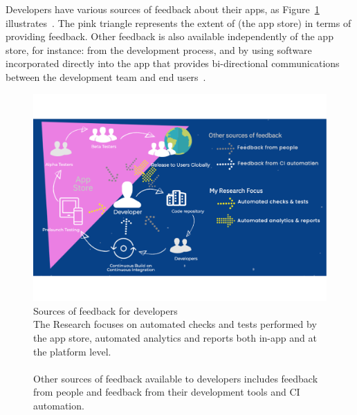 Developers have various sources of feedback about their apps, as Figure~\ref{fig:sources-of-feedback-for-developers} illustrates~. The pink triangle represents the extent of  (the app store) in terms of providing feedback. Other feedback is also available independently of the app store, for instance: from the development process, and by using software incorporated directly into the app that provides bi-directional communications between the development team and end users~.

\begin{figure}
    \includegraphics[width=\linewidth]{images/mobilesoft/silvias-developer-centric-figure-mobilesoft2020.pdf}
    \caption[Sources of feedback for developers]{Sources of feedback for developers \\The Research focuses on automated checks and tests performed by the app store, automated analytics and reports both in-app and at the platform level. \\ \\Other sources of feedback available to developers includes feedback from people and feedback from their development tools and CI automation.}
    \label{fig:sources-of-feedback-for-developers}
\end{figure}

